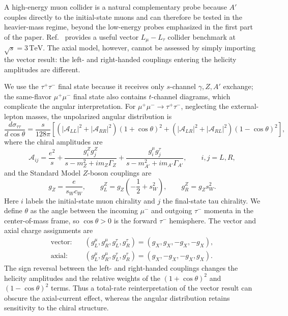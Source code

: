 \documentclass[12pt,a4paper]{article}
\begin{document}
A high-energy muon collider is a natural complementary probe because \(A'\) couples directly to the initial-state muons and can therefore be tested in the heavier-mass regime, beyond the low-energy probes emphasized in the first part of the paper. Ref.~\cite{Huang:2021nkl} provides a useful vector \(L_\mu-L_\tau\) collider benchmark at \(\sqrt{s}=3\,\mathrm{TeV}\). The axial model, however, cannot be assessed by simply importing the vector result: the left- and right-handed couplings entering the helicity amplitudes are different.

We use the \(\tau^+\tau^-\) final state because it receives only \(s\)-channel \(\gamma,Z,A'\) exchange; the same-flavor \(\mu^+\mu^-\) final state also contains \(t\)-channel diagrams, which complicate the angular interpretation. For \(\mu^+\mu^-\to\tau^+\tau^-\), neglecting the external-lepton masses, the unpolarized angular distribution is
\[
\frac{d\sigma_{\tau\tau}}{d\cos\theta}
=
\frac{s}{128\pi}
\left[
\left(|\mathcal A_{LL}|^2+|\mathcal A_{RR}|^2\right)(1+\cos\theta)^2
+
\left(|\mathcal A_{LR}|^2+|\mathcal A_{RL}|^2\right)(1-\cos\theta)^2
\right],
\]
where the chiral amplitudes are
\[
\mathcal A_{ij}
=
\frac{e^2}{s}
+\frac{g_i^Zg_j^Z}{s-m_Z^2+i m_Z\Gamma_Z}
+\frac{g_i^\mu g_j^\tau}{s-m_{A'}^2+i m_{A'}\Gamma_{A'}},
\qquad i,j=L,R,
\]
and the Standard Model \(Z\)-boson couplings are
\[
g_Z=\frac{e}{s_Wc_W},\qquad
g_L^Z=g_Z\left(-\frac12+s_W^2\right),\qquad
g_R^Z=g_Zs_W^2.
\]
Here \(i\) labels the initial-state muon chirality and \(j\) the final-state tau chirality. We define \(\theta\) as the angle between the incoming \(\mu^-\) and outgoing \(\tau^-\) momenta in the center-of-mass frame, so \(\cos\theta>0\) is the forward \(\tau^-\) hemisphere.
The vector and axial charge assignments are
\[
\begin{aligned}
\text{vector:}\quad&
(g_L^\mu,g_R^\mu,g_L^\tau,g_R^\tau)
=(g_X,g_X,-g_X,-g_X),\\
\text{axial:}\quad&
(g_L^\mu,g_R^\mu,g_L^\tau,g_R^\tau)
=(g_X,-g_X,-g_X,g_X).
\end{aligned}
\]
The sign reversal between the left- and right-handed couplings changes the helicity amplitudes and the relative weights of the \((1+\cos\theta)^2\) and \((1-\cos\theta)^2\) terms. Thus a total-rate reinterpretation of the vector result can obscure the axial-current effect, whereas the angular distribution retains sensitivity to the chiral structure.
\end{document}
